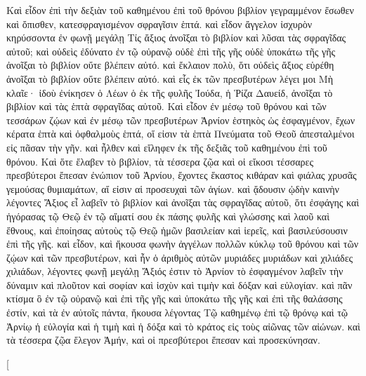 \begin{pages}
    \begin{Rightside}
        \beginnumbering
		Καὶ εἶδον ἐπὶ τὴν δεξιὰν τοῦ καθημένου ἐπὶ τοῦ θρόνου βιβλίον γεγραμμένον ἔσωθεν καὶ ὄπισθεν, κατεσφραγισμένον σφραγῖσιν ἑπτά. καὶ εἶδον ἄγγελον ἰσχυρὸν κηρύσσοντα ἐν φωνῇ μεγάλῃ Τίς ἄξιος ἀνοῖξαι τὸ βιβλίον καὶ λῦσαι τὰς σφραγῖδας αὐτοῦ; καὶ οὐδεὶς ἐδύνατο ἐν τῷ οὐρανῷ οὐδὲ ἐπὶ τῆς γῆς οὐδὲ ὑποκάτω τῆς γῆς ἀνοῖξαι τὸ βιβλίον οὔτε βλέπειν αὐτό. καὶ ἔκλαιον πολὺ, ὅτι οὐδεὶς ἄξιος εὑρέθη ἀνοῖξαι τὸ βιβλίον οὔτε βλέπειν αὐτό.
		\pend
		\pstart
		καὶ εἷς ἐκ τῶν πρεσβυτέρων λέγει μοι Μὴ κλαῖε· ἰδοὺ ἐνίκησεν ὁ Λέων ὁ ἐκ τῆς φυλῆς Ἰούδα, ἡ Ῥίζα Δαυείδ, ἀνοῖξαι τὸ βιβλίον καὶ τὰς ἑπτὰ σφραγῖδας αὐτοῦ. Καὶ εἶδον ἐν μέσῳ τοῦ θρόνου καὶ τῶν τεσσάρων ζῴων καὶ ἐν μέσῳ τῶν πρεσβυτέρων Ἀρνίον ἑστηκὸς ὡς ἐσφαγμένον, ἔχων κέρατα ἑπτὰ καὶ ὀφθαλμοὺς ἑπτά, οἵ εἰσιν τὰ ἑπτὰ Πνεύματα τοῦ Θεοῦ ἀπεσταλμένοι εἰς πᾶσαν τὴν γῆν. καὶ ἦλθεν καὶ εἴληφεν ἐκ τῆς δεξιᾶς τοῦ καθημένου ἐπὶ τοῦ θρόνου. 
		\pend
		\pstart
		Καὶ ὅτε ἔλαβεν τὸ βιβλίον, τὰ τέσσερα ζῷα καὶ οἱ εἴκοσι τέσσαρες πρεσβύτεροι ἔπεσαν ἐνώπιον τοῦ Ἀρνίου, ἔχοντες ἕκαστος κιθάραν καὶ φιάλας χρυσᾶς γεμούσας θυμιαμάτων, αἵ εἰσιν αἱ προσευχαὶ τῶν ἁγίων. καὶ ᾄδουσιν ᾠδὴν καινὴν λέγοντες Ἄξιος εἶ λαβεῖν τὸ βιβλίον καὶ ἀνοῖξαι τὰς σφραγῖδας αὐτοῦ, ὅτι ἐσφάγης καὶ ἠγόρασας τῷ 	Θεῷ ἐν τῷ αἵματί σου ἐκ πάσης φυλῆς καὶ γλώσσης καὶ λαοῦ καὶ ἔθνους, καὶ ἐποίησας αὐτοὺς τῷ Θεῷ ἡμῶν βασιλείαν καὶ ἱερεῖς, καὶ βασιλεύσουσιν ἐπὶ τῆς γῆς.
		\pend
		\pstart
		καὶ εἶδον, καὶ ἤκουσα φωνὴν ἀγγέλων πολλῶν κύκλῳ τοῦ θρόνου καὶ τῶν ζῴων καὶ τῶν πρεσβυτέρων, καὶ ἦν ὁ ἀριθμὸς αὐτῶν μυριάδες μυριάδων καὶ χιλιάδες χιλιάδων, λέγοντες φωνῇ μεγάλῃ Ἄξιός ἐστιν τὸ Ἀρνίον τὸ ἐσφαγμένον λαβεῖν τὴν δύναμιν καὶ πλοῦτον καὶ σοφίαν καὶ 	ἰσχὺν καὶ τιμὴν καὶ δόξαν καὶ εὐλογίαν. καὶ πᾶν κτίσμα ὃ ἐν τῷ οὐρανῷ καὶ ἐπὶ τῆς γῆς καὶ ὑποκάτω τῆς γῆς καὶ ἐπὶ τῆς θαλάσσης ἐστίν, καὶ τὰ ἐν αὐτοῖς πάντα, ἤκουσα λέγοντας Τῷ καθημένῳ ἐπὶ τῷ θρόνῳ καὶ τῷ Ἀρνίῳ ἡ εὐλογία καὶ ἡ τιμὴ καὶ ἡ δόξα καὶ τὸ κράτος εἰς τοὺς αἰῶνας τῶν αἰώνων. καὶ τὰ τέσσερα ζῷα ἔλεγον Ἀμήν, καὶ οἱ πρεσβύτεροι ἔπεσαν καὶ προσεκύνησαν.
		\pend
        \endnumbering
    \end{Rightside}
    \begin{Leftside}
        \beginnumbering
        \pstart[

\end{Leftside}
\end{pages}
